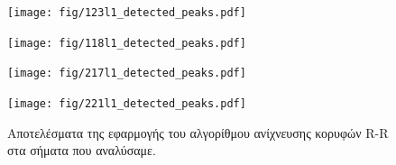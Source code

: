 \documentclass[11pt,a4paper]{article}
\begin{document}
\begin{figure}[H]
\centering
\begin{minipage}{0.48\textwidth}
	\centering
	\texttt{[image: fig/123l1\_detected\_peaks.pdf]}
\end{minipage}
\begin{minipage}{0.48\textwidth}
	\centering
	\texttt{[image: fig/118l1\_detected\_peaks.pdf]}
\end{minipage}
\end{figure}

\begin{figure}[H]
\centering
\begin{minipage}{0.48\textwidth}
	\centering
	\texttt{[image: fig/217l1\_detected\_peaks.pdf]}
\end{minipage}
\begin{minipage}{0.48\textwidth}
	\centering
	\texttt{[image: fig/221l1\_detected\_peaks.pdf]}
\end{minipage}
\vfill
\caption{Αποτελέσματα της εφαρμογής του αλγορίθμου ανίχνευσης κορυφών R-R στα σήματα που αναλύσαμε.}
\label{fig:detected_peaks}
\end{figure}
\end{document}
